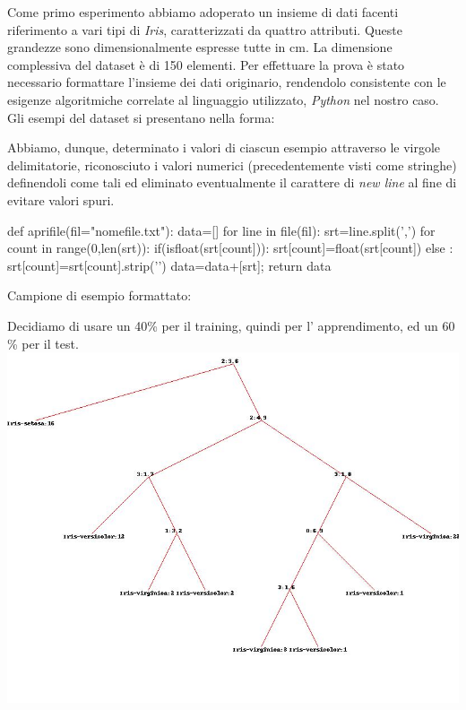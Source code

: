		Come primo esperimento abbiamo adoperato un insieme di dati facenti riferimento a vari tipi di \emph{Iris}, caratterizzati da quattro attributi.
		Queste grandezze sono dimensionalmente espresse tutte in cm. La dimensione complessiva del dataset è di 150 elementi. Per effettuare la prova è stato necessario formattare l'insieme dei dati originario, rendendolo consistente con le esigenze algoritmiche correlate al linguaggio utilizzato, \emph{Python} nel nostro caso. Gli esempi del dataset si presentano nella forma:
		
		Abbiamo, dunque, determinato i valori di ciascun esempio attraverso le virgole delimitatorie, riconosciuto i valori numerici (precedentemente visti come stringhe) definendoli come tali ed eliminato eventualmente il carattere di \textit{new line} al fine di evitare valori spuri.
		\newline
		\begin{python}
		def aprifile(fil="nomefile.txt"):
			data=[]
			for line in file(fil):
				srt=line.split(',')
				for count in range(0,len(srt)):
					if(isfloat(srt[count])):
						srt[count]=float(srt[count])
					else :
						srt[count]=srt[count].strip('\n')
				data=data+[srt];
			return data
		\end{python}
		Campione di esempio formattato:
		
		
		Decidiamo di usare un 
		40\% per il training, quindi per l' apprendimento, ed un 60 \% per il test.
		\includegraphics[scale=0.37]{iris.jpg}
		
